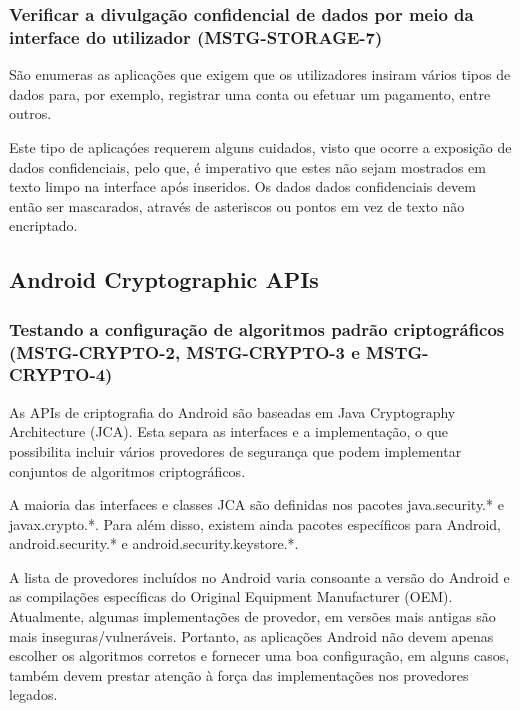 \subsubsection{Verificar a divulgação confidencial de dados por meio da interface do utilizador (MSTG-STORAGE-7)}
\par São enumeras as aplicações que exigem que os utilizadores insiram vários tipos de dados para, por exemplo, registrar uma conta ou efetuar um pagamento, entre outros. 
\par Este tipo de aplicaçóes requerem alguns cuidados, visto que ocorre a exposição de dados confidenciais, pelo que, é imperativo que estes não sejam mostrados em texto limpo na interface após inseridos. Os dados dados confidenciais devem então ser mascarados, através de asteriscos ou pontos em vez de texto não encriptado.






\newpage
\subsection{Android Cryptographic APIs}

\subsubsection{Testando a configuração de algoritmos padrão criptográficos (MSTG-CRYPTO-2, MSTG-CRYPTO-3 e MSTG-CRYPTO-4)}
\par As APIs de criptografia do Android são baseadas em Java Cryptography Architecture (JCA). Esta separa as interfaces e a implementação, o que possibilita incluir vários provedores de segurança que podem implementar conjuntos de algoritmos criptográficos.
\par A maioria das interfaces e classes JCA são definidas nos pacotes java.security.* e javax.crypto.*. Para além disso, existem ainda pacotes específicos para Android, android.security.* e android.security.keystore.*.

\par A lista de provedores incluídos no Android varia consoante a versão do Android e as compilações específicas do Original Equipment Manufacturer (OEM). Atualmente, algumas implementações de provedor, em versões mais antigas são mais inseguras/vulneráveis. Portanto, as aplicações Android não devem apenas escolher os algoritmos corretos e fornecer uma boa configuração, em alguns casos, também devem prestar atenção à força das implementações nos provedores legados.



